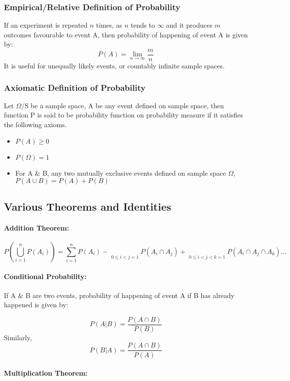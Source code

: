\documentclass[
10pt, %
a4paper, %
]{report}
\begin{document}
\subsubsection*{Empirical/Relative Definition of Probability}
 If an experiment is repeated \(n\) times, as \(n\) tends to \(\infty\) and it produces \(m\) outcomes favourable to event A, then probability of happening of event A is given by:
\[
P(A)=\lim_{n\to\infty}\frac{m}{n}
\]
It is useful for unequally likely events, or countably infinite sample spaces.

\subsubsection*{Axiomatic Definition of Probability}
    Let \(\Omega\)/S be a sample space, A be any event defined on sample space, then function P is said to be probability function on probability measure if it satisfies the following axioms.
    \begin{itemize}
    \item \(P(A)\geq 0\)
    \item \(P(\Omega)=1\)
    \item For A \& B, any two mutually exclusive events defined on sample space \(\Omega\), \(P(A\cup B) = P(A)+P(B)\)
    \end{itemize}
    

\subsection*{Various Theorems and Identities}
\paragraph{Addition Theorem:}
\[
P\left(\bigcup_{i=1}^n P(A_i)\right)=\sum_{i=1}^n P(A_i) - \mathop{\sum^n \sum^n}\limits_{0 \leq i < j=1} P(A_i \cap A_j) + \mathop{\sum^n \sum^n \sum^n}\limits_{0 \leq i < j < k=1} P(A_i \cap A_j \cap A_k) \dots \]


\paragraph{Conditional Probability:}

If A \& B are two events, probability of happening of event A if B has already happened is given by:

\[
P(A|B) = \frac{P(A\cap B)}{P(B)}
\]
Similarly, 
\[
P(B|A) = \frac{P(A\cap B)}{P(A)}
\]

\paragraph{Multiplication Theorem:}
\end{document}
